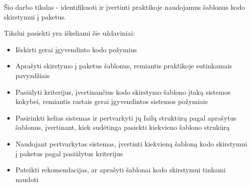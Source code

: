 Šio darbo tikslas - identifikuoti ir įvertinti praktikoje naudojamus šablonus kodo skirstymui į paketus.

Tikslui pasiekti yra iškeliami šie uždaviniai:
\begin{itemize}
    \item  Išskirti gerai įgyvendinto kodo požymius
    \item  Aprašyti skirstymo į paketus šablonus, remiantis praktikoje sutinkamais pavyzdžiais
    \item  Pasiūlyti kriterijus, įvertinančius kodo skirstymo šablono įtaką sistemos kokybei, remiantis
rastais gerai įgyvendintos sistemos požymiais
    \item  Pasirinkti kelias sistemas ir pertvarkyti jų failų struktūrą pagal aprašytus šablonus, įvertinant,
kiek sudėtinga pasiekti kiekvieno šablono strukūrą
    \item  Naudojant pertvarkytas sistemas, įvertinti kiekvieną šabloną kodo skirstymui į paketus pagal pasiūlytus kriterijus
    \item  Pateikti rekomendacijas, ar aprašyti šablonai kodo skirstymui tinkami naudoti
\end{itemize}




